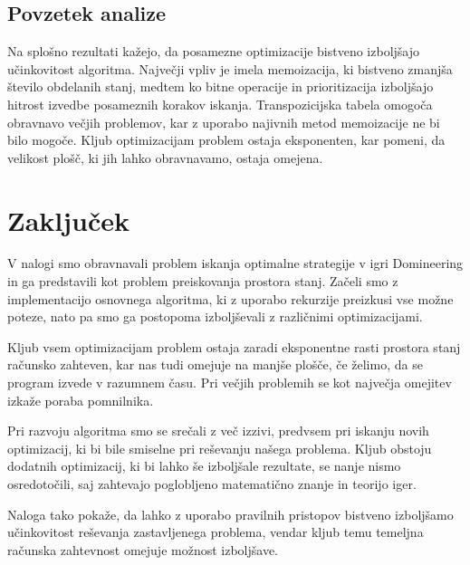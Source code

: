 \documentclass[12pt]{report}
\begin{document}
\section{Povzetek analize}
Na splošno rezultati kažejo, da posamezne optimizacije bistveno izboljšajo učinkovitost algoritma. Največji vpliv je imela memoizacija, ki bistveno zmanjša število obdelanih stanj, medtem ko bitne operacije in prioritizacija izboljšajo hitrost izvedbe posameznih korakov iskanja. Transpozicijska tabela omogoča obravnavo večjih problemov, kar z uporabo najivnih metod memoizacije ne bi bilo mogoče. Kljub optimizacijam problem ostaja eksponenten, kar pomeni, da velikost plošč, ki jih lahko obravnavamo, ostaja omejena.

\chapter{Zaključek}

V nalogi smo obravnavali problem iskanja optimalne strategije v igri Domineering in ga predstavili kot problem preiskovanja prostora stanj. Začeli smo z implementacijo osnovnega algoritma, ki z uporabo rekurzije preizkusi vse možne poteze, nato pa smo ga postopoma izboljševali z različnimi optimizacijami.

Kljub vsem optimizacijam problem ostaja zaradi eksponentne rasti prostora stanj računsko zahteven, kar nas tudi omejuje na manjše plošče, če želimo, da se program izvede v razumnem času. Pri večjih problemih se kot največja omejitev izkaže poraba pomnilnika.

Pri razvoju algoritma smo se srečali z več izzivi, predvsem pri iskanju novih optimizacij, ki bi bile smiselne pri reševanju našega problema. Kljub obstoju dodatnih optimizacij, ki bi lahko še izboljšale rezultate, se nanje nismo osredotočili, saj zahtevajo poglobljeno matematično znanje in teorijo iger.

Naloga tako pokaže, da lahko z uporabo pravilnih pristopov bistveno izboljšamo učinkovitost reševanja zastavljenega problema, vendar kljub temu temeljna računska zahtevnost omejuje možnost izboljšave. 
\end{document}
